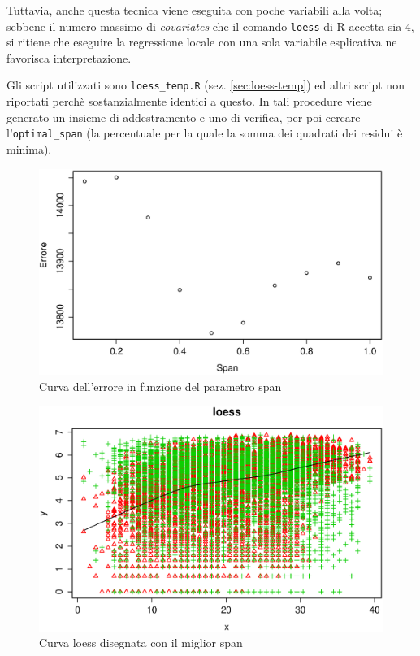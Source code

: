 Tuttavia, anche questa tecnica viene eseguita con poche variabili alla volta;
sebbene il numero massimo di \emph{covariates} che il comando \texttt{loess}
di R accetta sia 4, si ritiene che eseguire la regressione locale con una
sola variabile esplicativa ne favorisca interpretazione.

Gli script utilizzati sono \texttt{loess\_temp.R} (sez. \ref{sec:loess-temp})
ed altri script non riportati perchè sostanzialmente identici a questo. In
tali procedure viene generato un insieme di addestramento e uno di verifica,
per poi cercare l'\texttt{optimal\_span} (la percentuale per la quale la somma
dei quadrati dei residui è minima).

\begin{figure}[H]
  \centering
  \includegraphics[width=.7\columnwidth]{images/non-linear/loess-error-span.eps}
  \caption{Curva dell'errore in funzione del parametro span}
  \label{fig:loess-optimal-span}
\end{figure}

\begin{figure}[H]
  \centering
  \includegraphics[width=.7\columnwidth]{images/non-linear/loess-draw.eps}
  \caption{Curva loess disegnata con il miglior span}
  \label{fig:loess-draw}
\end{figure}
